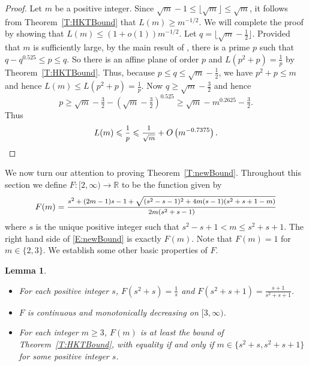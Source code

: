 \documentclass[11pt]{article}
\newtheorem{Lemma}[Theorem]{Lemma}
\theoremstyle{definition}
\renewcommand{\leq}{\leqslant}
\renewcommand{\geq}{\geqslant}
\begin{document}
\begin{proof}
Let $m$ be a positive integer. Since $ \sqrt{m}-1 \leq \lfloor \sqrt{m} \rfloor \leq \sqrt{m}$, it follows from Theorem~\ref{T:HKTBound} that $L(m) \geq m^{-1/2}$. We will complete the proof by showing that  $L(m) \leq (1+o(1))m^{-1/2}$. Let $q=\lfloor \sqrt{m} - \frac{1}{2} \rfloor$. Provided that $m$ is sufficiently large, by the main result of \cite{BakHarPin}, there is a prime $p$ such that $q-q^{0.525} \leq p \leq q$. So there is an affine plane of order $p$ and $L(p^2+p)=\frac{1}{p}$ by Theorem~\ref{T:HKTBound}. Thus, because $p \leq q \leq \sqrt{m} - \frac{1}{2}$, we have $p^2+p \leq m$ and hence $L(m) \leq L(p^2+p)=\frac{1}{p}$. Now $q \geq \sqrt{m} - \frac{3}{2}$ and hence
\[p \geq \sqrt{m} - \tfrac{3}{2} - \left(\sqrt{m} - \tfrac{3}{2}\right)^{0.525} \geq \sqrt{m} - m^{0.2625} - \tfrac{3}{2}.\]
Thus
\[L(m) \leq \mfrac{1}{p} \leq \mfrac{1}{\sqrt{m}}+O\left(m^{-0.7375}\right). \qedhere\]
\end{proof}

We now turn our attention to proving Theorem~\ref{T:newBound}. Throughout this section we define $F:[2,\infty) \rightarrow \mathbb{R}$ to be the function given by
\[F(m) = \mfrac{s^2 + (2m-1)s - 1  + \sqrt{(s^2-s-1)^2 + 4m(s-1)(s^2 + s + 1 - m)}}{2 m (s^2+s-1)}\]
where $s$ is the unique positive integer such that $s^2-s+1< m \leq s^2+s+1$. The right hand side of \eqref{E:newBound} is exactly $F(m)$. Note that $F(m)=1$ for $m \in \{2,3\}$. We establish some other basic properties of $F$.

\begin{Lemma}\label{L:boundFacts}\phantom{a}
\begin{itemize}
    \item[\textup{(a)}]
For each positive integer $s$, $F(s^2+s)=\frac{1}{s}$ and $F(s^2+s+1)=\frac{s+1}{s^2+s+1}$.
    \item[\textup{(b)}]
$F$ is continuous and monotonically decreasing on $[3,\infty)$.
    \item[\textup{(c)}]
For each integer $m \geq 3$, $F(m)$ is at least the bound of Theorem~\ref{T:HKTBound}, with equality if and only if $m \in \{s^2+s,s^2+s+1\}$ for some positive integer $s$.
\end{itemize}
\end{Lemma}
\end{document}

